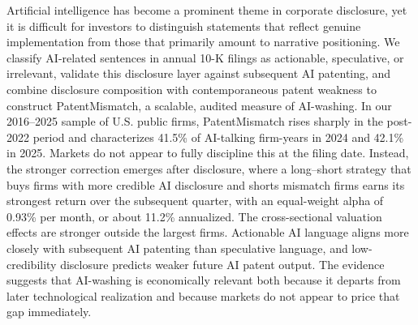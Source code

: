 Artificial intelligence has become a prominent theme in corporate disclosure, yet it is difficult for investors to distinguish statements that reflect genuine implementation from those that primarily amount to narrative positioning. We classify AI-related sentences in annual 10-K filings as actionable, speculative, or irrelevant, validate this disclosure layer against subsequent AI patenting, and combine disclosure composition with contemporaneous patent weakness to construct PatentMismatch, a scalable, audited measure of AI-washing. In our 2016--2025 sample of U.S. public firms, PatentMismatch rises sharply in the post-2022 period and characterizes 41.5\% of AI-talking firm-years in 2024 and 42.1\% in 2025. Markets do not appear to fully discipline this at the filing date. Instead, the stronger correction emerges after disclosure, where a long--short strategy that buys firms with more credible AI disclosure and shorts mismatch firms earns its strongest return over the subsequent quarter, with an equal-weight alpha of 0.93\% per month, or about 11.2\% annualized. The cross-sectional valuation effects are stronger outside the largest firms. Actionable AI language aligns more closely with subsequent AI patenting than speculative language, and low-credibility disclosure predicts weaker future AI patent output. The evidence suggests that AI-washing is economically relevant both because it departs from later technological realization and because markets do not appear to price that gap immediately.
